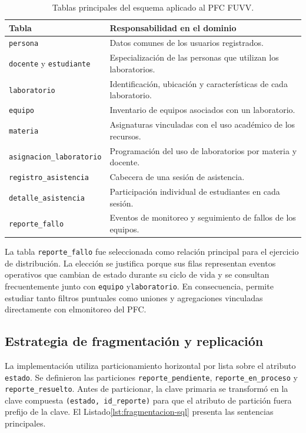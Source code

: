 \documentclass[12pt,a4paper]{article}
\begin{document}
\begin{table}[H]
  \centering
  \caption{Tablas principales del esquema aplicado al PFC FUVV.}
  \label{tab:tablas-fuvv}
  \begin{tabular}{@{}p{4.2cm}p{9.1cm}@{}}
    \toprule
    \textbf{Tabla} & \textbf{Responsabilidad en el dominio} \\
    \midrule
    \texttt{persona} & Datos comunes de los usuarios registrados. \\
    \texttt{docente} y \texttt{estudiante} & Especialización de las personas que utilizan los laboratorios. \\
    \texttt{laboratorio} & Identificación, ubicación y características de cada laboratorio. \\
    \texttt{equipo} & Inventario de equipos asociados con un laboratorio. \\
    \texttt{materia} & Asignaturas vinculadas con el uso académico de los recursos. \\
    \texttt{asignacion\_laboratorio} & Programación del uso de laboratorios por materia y docente. \\
    \texttt{registro\_asistencia} & Cabecera de una sesión de asistencia. \\
    \texttt{detalle\_asistencia} & Participación individual de estudiantes en cada sesión. \\
    \texttt{reporte\_fallo} & Eventos de monitoreo y seguimiento de fallos de los equipos. \\
    \bottomrule
  \end{tabular}
\end{table}

La tabla \texttt{reporte\_fallo} fue seleccionada como relación principal para el ejercicio de distribución. La elección se justifica porque sus filas representan eventos operativos que cambian de estado durante su ciclo de vida y se consultan frecuentemente junto con \texttt{equipo} y\texttt{laboratorio}. En consecuencia, permite estudiar tanto filtros puntuales como uniones y agregaciones vinculadas directamente con elmonitoreo del PFC.

\subsection{Estrategia de fragmentación y replicación}

La implementación utiliza particionamiento horizontal por lista sobre el atributo \texttt{estado}. Se definieron las particiones \texttt{reporte\_pendiente}, \texttt{reporte\_en\_proceso} y \texttt{reporte\_resuelto}. Antes de particionar, la clave primaria se transformó en la clave compuesta \texttt{(estado, id\_reporte)} para que el atributo de partición fuera prefijo de la clave. El Listado\ref{lst:fragmentacion-sql} presenta las sentencias principales.
\end{document}
